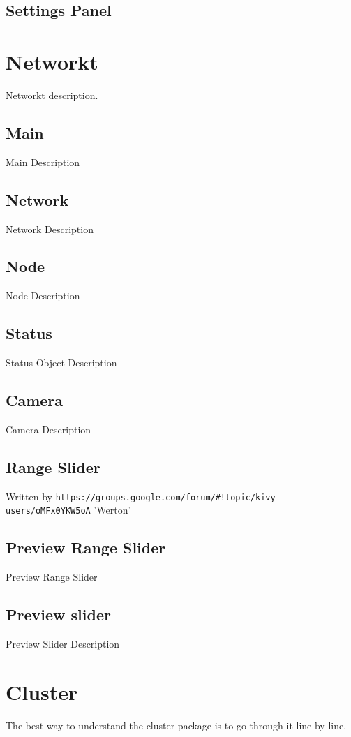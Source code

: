 \subsection{Settings Panel}


\section{Networkt}
Networkt description.
\subsection{Main}
Main Description
\subsection{Network}
Network Description
\subsection{Node}
Node Description
\subsection{Status}
Status Object Description
\subsection{Camera}
Camera Description
\subsection{Range Slider}
Written by \verb|https://groups.google.com/forum/#!topic/kivy-users/oMFx0YKW5oA| 'Werton'
\subsection{Preview Range Slider}
Preview Range Slider
\subsection{Preview slider}
Preview Slider Description

\section{Cluster}
The best way to understand the cluster package is to go through it line by line.

